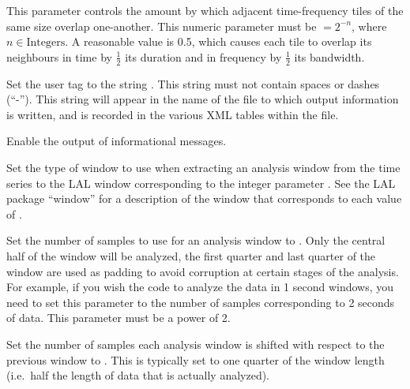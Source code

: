 \begin{entry}
\begin{entry}
\item[\option{--tile-stride-fraction} \parm{fraction}]
This parameter controls the amount by which adjacent time-frequency tiles
of the same size overlap one-another.  This numeric parameter must be \(=
2^{-n}\), where \(n \in \mathrm{Integers}\).  A reasonable value is 0.5,
which causes each tile to overlap its neighbours in time by \(\frac{1}{2}\)
its duration and in frequency by \(\frac{1}{2}\) its bandwidth.

\item[\option{--user-tag} \parm{comment}]
Set the user tag to the string .  This string must not
contain spaces or dashes (``-'').  This string will appear in the name of
the file to which output information is written, and is recorded in the
various XML tables within the file.

\item[\option{--verbose}]
Enable the output of informational messages.

\item[\option{--window} \parm{window}]
Set the type of window to use when extracting an analysis window from the
time series to the LAL window corresponding to the integer parameter
.  See the LAL package ``window'' for a description of the
window that corresponds to each value of .

\item[\option{--window-length} \parm{samples}]
Set the number of samples to use for an analysis window to .
Only the central half of the window will be analyzed, the first quarter and
last quarter of the window are used as padding to avoid corruption at
certain stages of the analysis.  For example, if you wish the code to
analyze the data in 1 second windows, you need to set this parameter to the
number of samples corresponding to 2 seconds of data.  This parameter must
be a power of 2.

\item[\option{--window-shift} \parm{samples}]
Set the number of samples each analysis window is shifted with respect to
the previous window to .  This is typically set to one
quarter of the window length (i.e.\ half the length of data that is
actually analyzed).

\end{entry}



\end{entry}
